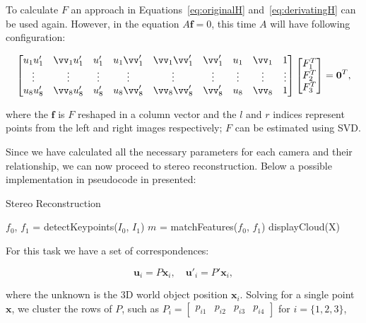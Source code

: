 \documentclass[12pt]{article}
\begin{document}
To calculate $F$ an approach in Equations~\ref{eq:originalH} and~\ref{eq:derivatingH} can be used again.
However, in the equation $A\mathbf{f} = 0$, this time $A$ will have following configuration:

\begin{equation}
\begin{bmatrix}
u_1 u_1' & 	\vv_1 u_1' & u_1' & u_1 \vv_1' & \vv_1 \vv_1' & \vv_1' & u_1 & \vv_1 & 1 \\
\vdots & \vdots & \vdots & \vdots & \vdots & \vdots & \vdots & \vdots & \vdots  \\
u_8 u_8' & \vv_8 u_8' & u_8' & u_8 \vv_8' & \vv_8 \vv_8' & \vv_8' & u_8 & \vv_8 & 1 
\end{bmatrix}
\begin{bmatrix}
F_1^T \\
F_2^T \\
F_3^T \\
\end{bmatrix}
= \mathbf{0}^T,
\end{equation}

where the $\mathbf{f}$ is $F$ reshaped in a column vector and the $l$ and $r$ indices represent points from the left and right images respectively; $F$ can be estimated using SVD.

Since we have calculated all the necessary parameters for each camera and their relationship, we can now proceed to stereo reconstruction.
Below a possible implementation in pseudocode in presented:

\begin{algorithm}[H]
 \caption{Stereo Reconstruction}
 $f_0$, $f_1$ = detectKeypoints($I_0$, $I_1$)\;
 $m$ = matchFeatures($f_0$, $f_1$)\;
 displayCloud(X)\;
\end{algorithm}

For this task we have a set of correspondences:

\begin{equation}
 \mathbf{u}_{i} = P\mathbf{x}_i, \quad \mathbf{u'}_{i} = P'\mathbf{x}_i,
\end{equation}

where the unknown is the 3D world object position $\mathbf{x}_i$.
Solving for a single point $\mathbf{x}$, we cluster the rows of $P$, such as $P_i = \begin{bmatrix} p_{i1} & p_{i2} & p_{i3} & p_{i4}  \end{bmatrix}$ for $i = \lbrace 1, 2, 3 \rbrace$,
\end{document}
